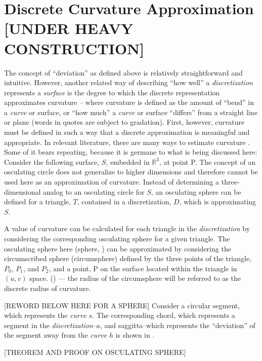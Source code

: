 \section{Discrete Curvature Approximation [UNDER HEAVY CONSTRUCTION]}
The concept of ``deviation'' as defined above is relatively
straightforward and intuitive. However, another related way of
describing ``how well'' a \textit{discretization} represents a
\textit{surface} is the degree to which the discrete representation
approximates curvature -- where curvature is defined as the amount of
``bend'' in a \textit{curve} or surface, or ``how much'' a
\textit{curve} or surface ``differs'' from a straight line or plane
(words in quotes are subject to gradation). First, however, curvature
must be defined in such a way that a discrete approximation is
meaningful and appropriate. In relevant literature, there are many ways
to estimate curvature \cite{hermann07}. Some of it bears repeating,
because it is germane to what is being discussed here: Consider the
following surface, $S$, embedded in ${\mathbb R}^3$, at point P. The
concept of an osculating circle does not generalize to higher dimensions
and therefore cannot be used here as an approximation of curvature.
Instead of determining a three-dimensional analog to an osculating
circle for $S$, an osculating sphere can be defined for a triangle, $T$,
contained in a discretization, $D$, which is approximating $S$.

A value of curvature can be calculated for each triangle in the
\textit{discretization} by considering the corresponding osculating
sphere for a given triangle. The osculating sphere here (sphere,
) can be approximated by considering the
circumscribed sphere (circumsphere) \cite{casey1888} defined by the
three points of the triangle, $P_0$, $P_1$, and $P_2$, and a point, P on
the surface located within the triangle in $(u,v)$ space.
() --- the radius of the circumsphere will
be referred to as the discrete radius of curvature.  

[REWORD BELOW HERE FOR A SPHERE]
Consider a circular segment, which represents the \textit{curve} $s$.
The corresponding chord, which represents a segment in the
\textit{discretization}--$a$, and saggitta--which represents the
``deviation'' of the segment away from the \textit{curve} $h$ is shown
in .  

[THEOREM AND PROOF ON OSCULATING SPHERE]

